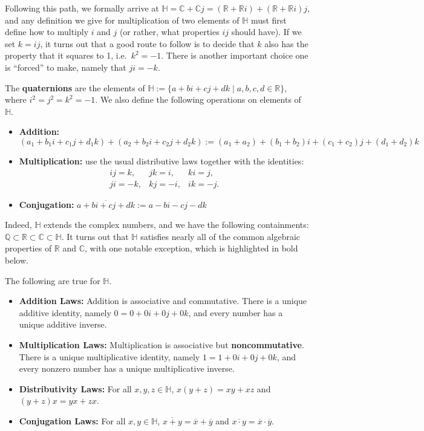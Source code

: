 Following this path, we formally arrive at $\mathbb{H} = \mathbb{C} + \mathbb{C}j= (\mathbb{R} + \mathbb{R}i) + (\mathbb{R} + \mathbb{R}i)j$, and any definition we give for multiplication of two elements of $\mathbb{H}$ must first define how to multiply $i$ and $j$ (or rather, what properties $ij$ should have). If we set $k=ij$, it turns out that a good route to follow is to decide that $k$ also has the property that it squares to 1, i.e.~$k^2 = -1$. There is another important choice one is ``forced'' to make, namely that $ji = -k$.

\begin{definition}
The \textbf{quaternions} are the elements of $\mathbb{H} := \{a + bi+ cj + dk\mid a,b,c,d \in \mathbb{R}\}$, where $i^2 = j^2 = k^2= -1$. We also define the following operations on elements of $\mathbb{H}$.
\begin{itemize}
\item \textbf{Addition:} $(a_1 + b_1i+ c_1j + d_1k) + (a_2 + b_2i+ c_2j + d_2k) := (a_1+a_2) + (b_1+b_2)i+ (c_1+c_2)j + (d_1+d_2)k$
\item \textbf{Multiplication:} use the usual distributive laws together with the identities:
\[\begin{array}{lll}
ij = k, &jk = i, &ki = j,\\
ji = -k, &kj = -i, &ik = -j.
\end{array}\]
\item \textbf{Conjugation:} $\overline{a + bi+ cj + dk} := a - bi -cj - dk$
\end{itemize}
\end{definition}

Indeed, $\mathbb{H}$ extends the complex numbers, and we have the following containments: $\mathbb{Q}\subset\mathbb{R}\subset\mathbb{C}\subset\mathbb{H}$. It turns out that $\mathbb{H}$ satisfies nearly all of the common algebraic properties of $\mathbb{R}$ and $\mathbb{C}$, with one notable exception, which is highlighted in bold below.

\begin{fact}\label{fact.QuaternionLaws} The following are true for $\mathbb{H}$.
\begin{itemize}
\item \textbf{Addition Laws:} Addition is associative and commutative. There is a unique additive identity, namely $0 = 0 + 0i+0j+0k$, and every number has a unique additive inverse.
\item \textbf{Multiplication Laws:} Multiplication is associative but \textbf{noncommutative}. There is a unique multiplicative identity, namely $1 = 1 + 0i+0j+0k$, and every nonzero number has a unique multiplicative inverse.
\item \textbf{Distributivity Laws:} For all $x,y,z \in \mathbb{H}$, $x(y+z) = xy+xz$ and $(y+z)x = yx+zx$.
\item \textbf{Conjugation Laws:} For all $x,y \in \mathbb{H}$, $\overline{x+y} = \overline{x} + \overline{y}$ and $\overline{x\cdot y} = \overline{x}\cdot\overline{y}$.
\end{itemize}
\end{fact}

